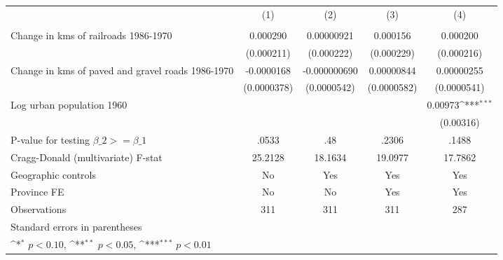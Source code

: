 {
\def\sym#1{\ifmmode^{#1}\else\(^{#1}\)\fi}
\begin{tabular}{l*{4}{c}}
\hline\hline
                &\multicolumn{1}{c}{(1)}&\multicolumn{1}{c}{(2)}&\multicolumn{1}{c}{(3)}&\multicolumn{1}{c}{(4)}\\
                &\multicolumn{1}{c}{}&\multicolumn{1}{c}{}&\multicolumn{1}{c}{}&\multicolumn{1}{c}{}\\
\hline
Change in kms of railroads 1986-1970& 0.000290         &0.00000921         & 0.000156         & 0.000200         \\
                &(0.000211)         &(0.000222)         &(0.000229)         &(0.000216)         \\
[1em]
Change in kms of paved and gravel roads 1986-1970&-0.0000168         &-0.000000690         &0.00000844         &0.00000255         \\
                &(0.0000378)         &(0.0000542)         &(0.0000582)         &(0.0000541)         \\
[1em]
Log urban population 1960&                  &                  &                  &  0.00973\sym{***}\\
                &                  &                  &                  &(0.00316)         \\
\hline
P-value for testing $\beta\_{2} >= \beta\_{1}$&    .0533         &      .48         &    .2306         &    .1488         \\
Cragg-Donald (multivariate) F-stat&  25.2128         &  18.1634         &  19.0977         &  17.7862         \\
Geographic controls&       No         &      Yes         &      Yes         &      Yes         \\
Province FE     &       No         &       No         &      Yes         &      Yes         \\
Observations    &      311         &      311         &      311         &      287         \\
\hline\hline
\multicolumn{5}{l}{\footnotesize Standard errors in parentheses}\\
\multicolumn{5}{l}{\footnotesize \sym{*} \(p<0.10\), \sym{**} \(p<0.05\), \sym{***} \(p<0.01\)}\\
\end{tabular}
}
